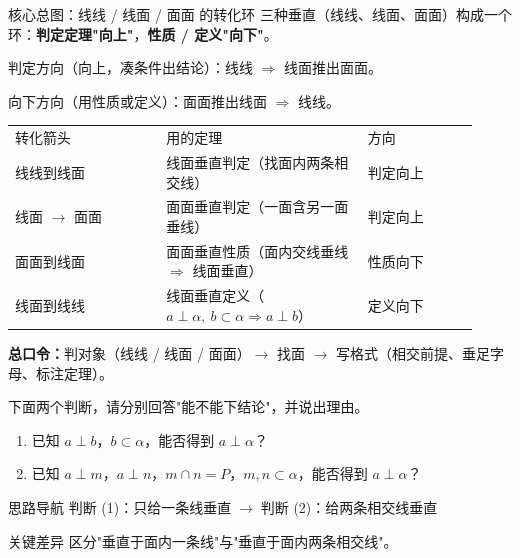 \documentclass{exam-zh}
\begin{document}
\begin{eduSolutionBox}{核心总图：线线 / 线面 / 面面 的转化环}
  \begingroup
  \setlength{\parskip}{2.5mm}
三种垂直（线线、线面、面面）构成一个环：\textbf{判定定理"向上"}，\textbf{性质 / 定义"向下"}。\par
判定方向（向上，凑条件出结论）：线线 $\Rightarrow$ 线面推出面面。\par
向下方向（用性质或定义）：面面推出线面 $\Rightarrow$ 线线。\par
\begin{tabular}{p{0.30\linewidth}p{0.40\linewidth}p{0.22\linewidth}}
转化箭头 & 用的定理 & 方向\\
线线到线面 & 线面垂直判定（找面内两条相交线） & 判定向上\\
线面 $\to$ 面面 & 面面垂直判定（一面含另一面垂线） & 判定向上\\
面面到线面 & 面面垂直性质（面内交线垂线 $\Rightarrow$ 线面垂直） & 性质向下\\
线面到线线 & 线面垂直定义（$a\perp\alpha,\ b\subset\alpha\Rightarrow a\perp b$） & 定义向下
\end{tabular}
\par
\textbf{总口令：}判对象（线线 / 线面 / 面面）$\to$ 找面 $\to$ 写格式（相交前提、垂足字母、标注定理）。\par
  \endgroup
\end{eduSolutionBox}




\begin{eduProblemBlock}
下面两个判断，请分别回答"能不能下结论"，并说出理由。
\begin{enumerate}[label=(\arabic*)]
\item 已知 $a\perp b$，$b\subset\alpha$，能否得到 $a\perp\alpha$？
\item 已知 $a\perp m$，$a\perp n$，$m\cap n=P$，$m,n\subset\alpha$，能否得到 $a\perp\alpha$？
\end{enumerate}
\end{eduProblemBlock}





\begin{eduAuxItem}{思路导航}
判断 (1)：只给一条线垂直$\;\to\;$判断 (2)：给两条相交线垂直\end{eduAuxItem}




\begin{eduSubQuestionItem}{关键差异}
区分"垂直于面内一条线"与"垂直于面内两条相交线"。\end{eduSubQuestionItem}
\end{document}
